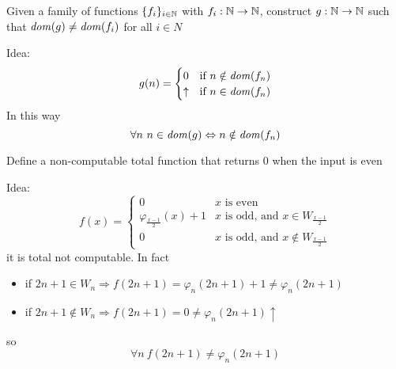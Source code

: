 \begin{exercise}
  Given a family of functions
  $\{f_i\}_{i\in \mathbb{N}}$ with $ f_i : \mathbb{N} \to \mathbb{N}$, construct $g: \mathbb{N} \to \mathbb{N}$
  such that $\mathit{dom}({g}) \neq \mathit{dom}({f_i})$ for all $i \in N$

  Idea:
  \[
    g(n) = \begin{cases}
      0 & \mbox{if } n \notin \mathit{dom}({f_n}) \\
      \uparrow & \mbox{if } n \in \mathit{dom}({f_n})
    \end{cases}
  \]
  In this way 
  \[
    \forall n \ n \in \mathit{dom}({g}) \Leftrightarrow 
  n \notin \mathit{dom}({f_n})
    \]
\end{exercise}

\begin{exercise}
  Define a non-computable total function that returns $0$ when the input
  is even

  Idea:
  \[
    f(x) = \begin{cases}
      0 & x \mbox{ is even} \\
      \varphi_{\frac{x-1}{2}}(x) + 1 & x \mbox{ is odd, and } x \in
      W_{\frac{x-1}{2}} \\
      0 & x \mbox{ is odd, and } x \notin W_{\frac{x-1}{2}}
    \end{cases}
  \]
  it is total not computable. In fact
  \begin{itemize}
    \item if
    $2n+1 \in W_n \Rightarrow f(2n+1) = \varphi_{n}(2n+1) + 1 \neq
    \varphi_n(2n+1)$
    \item if
    $2n+1 \notin W_n \Rightarrow f(2n+1) = 0 \neq \varphi_n(2n+1)
    \uparrow $
  \end{itemize}
  so \[
  \forall n \ f(2n + 1) \neq \varphi_n(2n+1)\]

  

  

\end{exercise}

